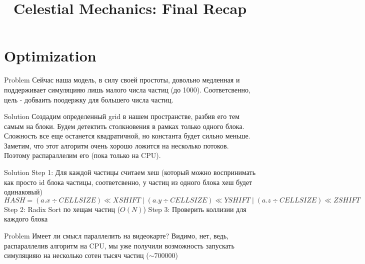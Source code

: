 \documentclass{beamer}
\title{Celestial Mechanics: Final Recap}
\begin{document}
\begin{frame}
  \titlepage
\end{frame}

\section{Optimization}

\begin{frame}[fragile]{Problem}
  Сейчас наша модель, в силу своей простоты, довольно медленная и поддерживает симуляцияю лишь
  малого числа частиц (до 1000). Соответсвенно, цель - добваить поодержку для большего числа частиц.
\end{frame}

\begin{frame}[fragile]{Solution}
  Создадим определенный grid в нашем пространстве, разбив его тем самым на блоки. Будем детектить
  столкновения в рамках только одного блока. Сложность все еще останется квадратичной, но константа
  будет сильно меньше.
  \newline
  \newline
  \pause
  Заметим, что этот алгоритм очень хорошо ложится на несколько потоков. Поэтому распараллелим его
  (пока только на CPU).
\end{frame}

\begin{frame}[fragile]{Solution}
  Step 1: Для каждой частицы считаем хеш (который можно воспринимать как просто id блока частицы,
  соответсвенно, у частиц из одного блока хеш будет одинаковый)
  \newline
  \newline
  $HASH = (a.x \div CELLSIZE) \ll XSHIFT \; \vert \; (a.y \div CELLSIZE) \ll YSHIFT \; \vert \; (a.z \div CELLSIZE) \ll ZSHIFT$
  \newline
  \newline
  \pause
  Step 2: Radix Sort по хещам частиц ($O(N)$)
  \newline
  \newline
  \pause
  Step 3: Проверить коллизии для каждого блока
\end{frame}

\begin{frame}[fragile]{Problem}
  Имеет ли смысл параллелить на видеокарте?
  \newline
  \newline
  \pause
  Видимо, нет, ведь, распараллелив алгоритм на CPU, мы уже получили возможность запускать симуляцияю
  на несколько сотен тысяч частиц ($\sim 700000$)
\end{frame}
\end{document}
